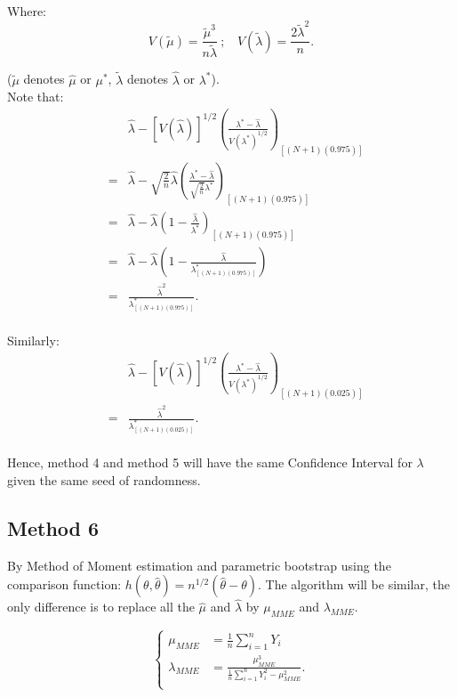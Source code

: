 \documentclass[12pt]{article}
\begin{document}
Where:
$$V(\tilde{\mu})=\frac{\tilde{\mu}^3}{n \tilde{\lambda}} \ ; \ \ \ \ V(\tilde{\lambda})=\frac{2\tilde{\lambda}^2}{n}.$$

($\tilde{\mu}$ denotes $\hat{\mu}$ or $\mu^{*}$,  $\tilde{\lambda}$ denotes $\hat{\lambda}$ or $\lambda^{*}$).
\\
Note that: 
\begin{eqnarray*}
&&\hat{\lambda}-[V(\hat{\lambda})]^{1/2}(\frac{\lambda^{*}-\hat{\lambda}}{V(\lambda^{*})^{1/2}})_{[(N+1)(0.975)]}\\
&=&\hat{\lambda}-\sqrt{\frac{2}{n}}\hat{\lambda}(\frac{\lambda^{*}-\hat{\lambda}}{\sqrt{\frac{2}{n}}\lambda^*})_{[(N+1)(0.975)]}\\
&=&\hat{\lambda}-\hat{\lambda}(1-\frac{\hat{\lambda}}{\lambda^*})_{[(N+1)(0.975)]}\\
&=&\hat{\lambda}-\hat{\lambda}(1-\frac{\hat{\lambda}}{\lambda^{*}_{[(N+1)(0.975)]}})\\
&=&\frac{\hat{\lambda}^2}{\lambda_{[(N+1)(0.975)]}^{*}}.\\
\end{eqnarray*}

Similarly:
\begin{eqnarray*}
&&\hat{\lambda}-[V(\hat{\lambda})]^{1/2}(\frac{\lambda^{*}-\hat{\lambda}}{V(\lambda^{*})^{1/2}})_{[(N+1)(0.025)]}\\
&=&\frac{\hat{\lambda}^2}{\lambda_{[(N+1)(0.025)]}^{*}}.\\
\end{eqnarray*}

Hence, method 4 and method 5 will have the same Confidence Interval for $\lambda$ given the same seed of randomness. 

\subsection{Method 6}
By Method of Moment estimation and parametric bootstrap using the comparison function: $h(\theta,\hat{\theta})=n^{1/2}(\hat{\theta}-\theta)$. The algorithm will be similar, the only difference is to replace all the $\hat{\mu}$ and $\hat{\lambda}$ by $\mu_{MME}$ and $\lambda_{MME}$.

 \begin{equation*}
\left\{                         
\begin{aligned}
\mu_{MME} &=\frac{1}{n} \sum_{i=1}^{n}Y_i \\
\lambda_{MME} &= \frac{\mu_{MME}^3}{\frac{1}{n} \sum_{i=1}^{n}Y_{i}^2 -  \mu_{MME}^2}. \\
\end{aligned}
\right.
\end{equation*}
\end{document}
